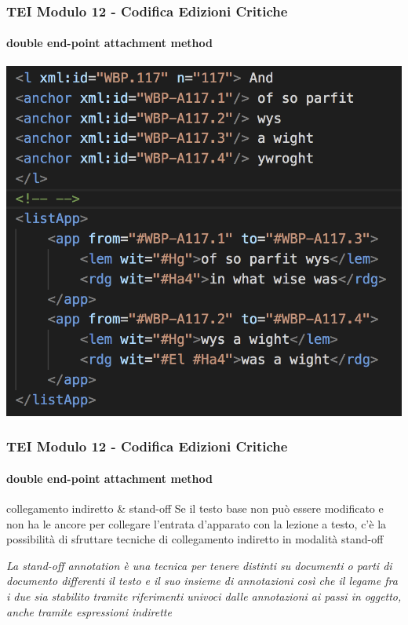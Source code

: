 \begin{frame}
    \frametitle{TEI Modulo 12 - Codifica Edizioni Critiche}
    \framesubtitle{double end-point attachment method}
    \addtocounter{nframe}{1}
   
    \begin{center}
       \includegraphics[width=.95\textwidth]{imgs/end-point-attachment-overlap.png}
    \end{center}

\end{frame}


\begin{frame}
    \frametitle{TEI Modulo 12 - Codifica Edizioni Critiche}
    \framesubtitle{double end-point attachment method}
    \addtocounter{nframe}{1}
    



    \begin{block}{collegamento indiretto & stand-off}
      Se il testo base non può essere modificato e non ha le ancore per collegare l'entrata d'apparato con la lezione a testo, c'è la possibilità di sfruttare tecniche di collegamento indiretto in modalità stand-off
    \end{block}

    \textit{La stand-off annotation è una tecnica per tenere distinti su documenti o parti di documento differenti il testo e il suo insieme di annotazioni così che il legame fra i due sia stabilito tramite riferimenti univoci dalle annotazioni ai passi in oggetto, anche tramite espressioni indirette}

\end{frame}

